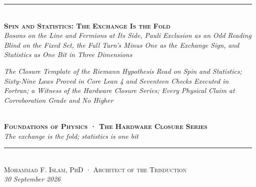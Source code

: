 \documentclass[10pt]{article}
\begin{document}
\begin{center}
{\color{accent}\rule{0.6\textwidth}{0.8pt}}\\[10pt]
{\bfseries\scshape\fontsize{19}{23}\selectfont Spin and Statistics: The
Exchange Is the Fold}\\[7pt]
{\itshape\large Bosons on the Line and Fermions at Its Side, Pauli
Exclusion as an Odd Reading Blind on the Fixed Set, the Full Turn's
Minus One as the Exchange Sign, and Statistics as One Bit in Three
Dimensions}\\[6pt]
\parbox{0.86\textwidth}{\centering\small\itshape\color{faint} The
Closure Template of the Riemann Hypothesis Read on Spin and Statistics;
Sixty-Nine Laws Proved in Core Lean 4 and Seventeen Checks Executed in
Fortran; a Witness of the Hardware Closure Series; Every Physical Claim
at Corroboration Grade and No Higher}\\[8pt]
{\footnotesize\color{accent}\scshape\bfseries Foundations of Physics ·
The Hardware Closure Series}\\[3pt]
{\itshape\color{deep}\small The exchange is the fold; statistics is one
bit}\\[9pt]
{\color{accent}\rule{0.6\textwidth}{0.8pt}}\\[10pt]
{\scshape Mohammad F. Islam, PhD · Architect of the Trisduction}\\[2pt]

{\itshape\color{faint}\small 30 September 2026}\\[12pt]
\end{center}
\noindent{\color{accent}\rule{\textwidth}{0.6pt}}\\[2pt]
\end{document}
